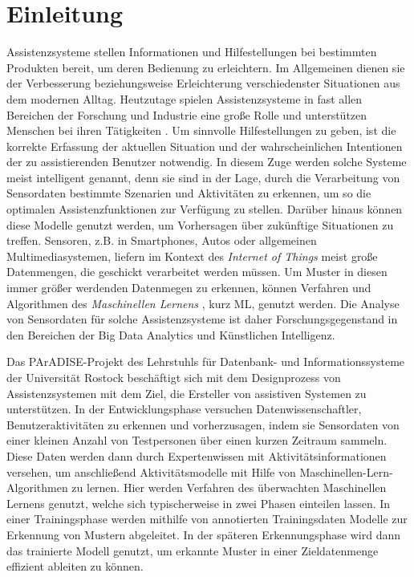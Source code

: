 \chapter{Einleitung}
\label{kap:intro}
Assistenzsysteme stellen Informationen und Hilfestellungen bei bestimmten Produkten bereit, um deren Bedienung zu erleichtern. Im Allgemeinen dienen sie der Verbesserung beziehungsweise Erleichterung verschiedenster Situationen aus dem modernen Alltag.
Heutzutage spielen Assistenzsysteme in fast allen Bereichen der Forschung und Industrie eine große Rolle und unterstützen Menschen bei ihren Tätigkeiten \cite{winner2014handbook, kurihata2005rainy, omerdic2011design}. Um sinnvolle Hilfestellungen zu geben, ist die korrekte Erfassung der aktuellen Situation und
der wahrscheinlichen Intentionen der zu assistierenden Benutzer notwendig. 
In diesem Zuge werden solche Systeme meist intelligent genannt, denn sie sind in der Lage, durch die Verarbeitung von Sensordaten bestimmte Szenarien und Aktivitäten zu erkennen, um so die optimalen Assistenzfunktionen zur Verfügung zu stellen. Darüber hinaus können diese Modelle genutzt werden, um Vorhersagen über zukünftige Situationen zu treffen.
Sensoren, z.B. in Smartphones, Autos oder allgemeinen Multimediasystemen, liefern im Kontext des \textit{Internet of Things} \cite{xia2012internet, wortmann2015internet}meist große Datenmengen, die geschickt verarbeitet werden müssen. Um Muster in diesen immer größer werdenden Datenmegen zu erkennen, können Verfahren und Algorithmen des \textit{Maschinellen Lernens} \cite{Goodfellow-et-al-2016}, kurz ML, genutzt werden. Die Analyse von Sensordaten für solche Assistenzsysteme ist daher Forschungsgegenstand in den Bereichen der Big Data Analytics \cite{d2019big} und Künstlichen Intelligenz. 

Das PArADISE-Projekt \cite{paradise} des Lehrstuhls für Datenbank- und Informationssysteme der Universität Rostock beschäftigt sich mit dem Designprozess von Assistenzsystemen mit dem Ziel, die Ersteller von assistiven Systemen zu unterstützen. In der Entwicklungsphase versuchen Datenwissenschaftler, Benutzeraktivitäten zu erkennen und vorherzusagen, indem sie Sensordaten von einer kleinen Anzahl von Testpersonen über einen kurzen Zeitraum sammeln. Diese Daten werden dann durch Expertenwissen mit Aktivitätsinformationen versehen, um anschließend Aktivitätsmodelle mit Hilfe von Maschinellen-Lern-Algorithmen zu lernen. Hier werden Verfahren des überwachten Maschinellen Lernens genutzt, welche sich typischerweise in zwei Phasen einteilen lassen. In einer Trainingsphase werden mithilfe von annotierten Trainingsdaten Modelle zur Erkennung von Mustern abgeleitet. In der späteren Erkennungsphase wird dann das
trainierte Modell genutzt, um erkannte Muster in einer Zieldatenmenge effizient ableiten
zu können. 
